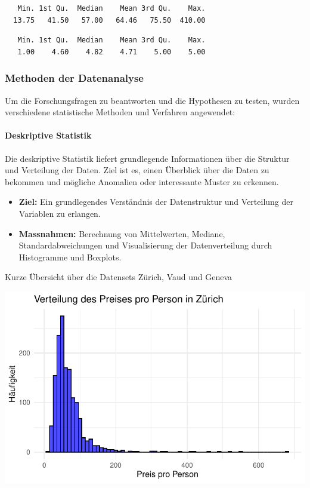 \documentclass[
  journal,
]{IEEEtran}%
\let\oldparagraph\paragraph
\renewcommand{\paragraph}[1]{\oldparagraph{#1}\mbox{}}
\begin{document}
\begin{verbatim}
   Min. 1st Qu.  Median    Mean 3rd Qu.    Max. 
  13.75   41.50   57.00   64.46   75.50  410.00 
\end{verbatim}

\begin{verbatim}
   Min. 1st Qu.  Median    Mean 3rd Qu.    Max. 
   1.00    4.60    4.82    4.71    5.00    5.00 
\end{verbatim}

\hypertarget{methoden-der-datenanalyse}{%
\subsubsection{Methoden der
Datenanalyse}\label{methoden-der-datenanalyse}}

Um die Forschungsfragen zu beantworten und die Hypothesen zu testen,
wurden verschiedene statistische Methoden und Verfahren angewendet:

\hypertarget{deskriptive-statistik}{%
\paragraph{\texorpdfstring{\textbf{Deskriptive
Statistik}}{Deskriptive Statistik}}\label{deskriptive-statistik}}

Die deskriptive Statistik liefert grundlegende Informationen über die
Struktur und Verteilung der Daten. Ziel ist es, einen Überblick über die
Daten zu bekommen und mögliche Anomalien oder interessante Muster zu
erkennen.

\begin{itemize}
\item
  \textbf{Ziel:} Ein grundlegendes Verständnis der Datenstruktur und
  Verteilung der Variablen zu erlangen.
\item
  \textbf{Massnahmen:} Berechnung von Mittelwerten, Mediane,
  Standardabweichungen und Visualisierung der Datenverteilung durch
  Histogramme und Boxplots.
\end{itemize}

Kurze Übersicht über die Datensets Zürich, Vaud und Geneva

\includegraphics{main_files/figure-pdf/descriptive zurich-1.pdf}
\end{document}
